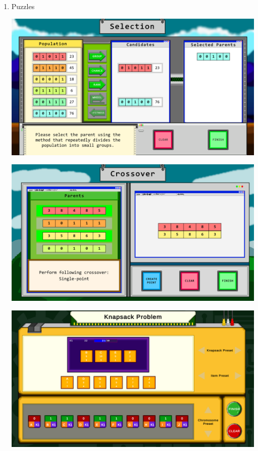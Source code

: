 \documentclass[12pt,oneside,openright,a4paper]{cpe-english-project}
\begin{document}
\begin{enumerate}
	\item Puzzles \\
	\begin{minipage}[c]{\textwidth}\centering
	\includegraphics[width=14cm]{figure/screenshot/screenshot-puzzle-selection.png}
	\end{minipage}
	\begin{minipage}[c]{\textwidth}\centering
	\includegraphics[width=14cm]{figure/screenshot/screenshot-puzzle-crossover.png}
	\end{minipage}
	\begin{minipage}[c]{\textwidth}\centering
	\includegraphics[width=14cm]{figure/screenshot/screenshot-puzzle-knapsack.png}

\end{minipage}
\end{enumerate}
\end{document}
